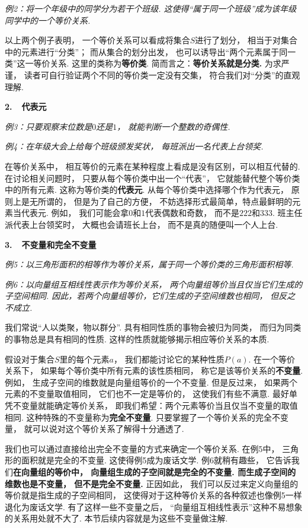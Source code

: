 \textit{例2：将一个年级中的同学分为若干个班级.
这使得“属于同一个班级”成为该年级同学中的一个等价关系.}
\medskip

以上两个例子表明，
一个等价关系可以看成将集合$S$进行了划分，
相当于对集合中的元素进行“分类”；
而从集合的划分出发，
也可以诱导出“两个元素属于同一类”这一等价关系.
这里的类称为\textbf{等价类}.
简而言之：\textbf{等价关系就是分类.}
为求严谨，
读者可自行验证两个不同的等价类一定没有交集，
符合我们对“分类”的直观理解.

\medskip

\textbf{2.~~代表元}

\textit{例3：只要观察末位数是$0$还是$1$，
就能判断一个整数的奇偶性.}

\textit{例4：在年级大会上给每个班级颁发奖状，
每班派出一名代表上台领奖.}
\medskip

在等价关系中，
相互等价的元素在某种程度上看成是没有区别，可以相互代替的.
在讨论相关问题时，
只要从每个等价类中出一个“代表”，
它就能替代整个等价类中的所有元素.
这称为等价类的\textbf{代表元}.
从每个等价类中选择哪个作为代表元，
原则上是无所谓的，
但是为了自己的方便，
不妨选择形式最简单，特点最鲜明的元素当代表元.
例如，
我们可能会拿$0$和$1$代表偶数和奇数，
而不是$222$和$333$.
班主任派代表上台领奖时，
大概也会请班长上台，
而不是真的随便叫一个人上台.
\medskip


\textbf{3.~~不变量和完全不变量}

\textit{例5：以三角形面积的相等作为等价关系，属于同一个等价类的三角形面积相等.}

\textit{例6：以向量组互相线性表示作为等价关系，
两个向量组等价当且仅当它们生成的子空间相同.
因此，若两个向量组等价，它们生成的子空间维数也相同，
但反之不成立.}
\medskip


我们常说“人以类聚，物以群分”.
具有相同性质的事物会被归为同类，
而归为同类的事物总是具有相同的性质.
这样的性质就能够揭示相应等价关系的本质.

假设对于集合$S$里的每个元素$a$，
我们都能讨论它的某种性质$P(a)$.
在一个等价关系下，
如果每个等价类中所有元素的该性质相同，
称它是该等价关系的\textbf{不变量}.
例如，
生成子空间的维数就是向量组等价的一个不变量.
但是反过来，
如果两个元素的不变量取值相同，
它们也不一定是等价的，
这使我们有些不满意.
最好单凭不变量就能确定等价关系，
即我们希望：两个元素等价当且仅当不变量的取值相同.
这种特殊的不变量称为\textbf{完全不变量}.
只要掌握了一个等价关系的完全不变量，
就可以说对这个等价关系了解得十分通透了.


我们也可以通过直接给出完全不变量的方式来确定一个等价关系.
在例5中，
三角形的面积就是完全的不变量.
这使得例5成为废话文学.
例6就稍有趣些，
它告诉我们\textbf{在向量组的等价中，
向量组生成的子空间就是完全的不变量.
而生成子空间的维数也是不变量，
但不是完全不变量.}
正因如此，
我们可以反过来定义向量组的等价就是指生成的子空间相同，
这使得对于这种等价关系的各种叙述也像例5一样退化为废话文学.
有了这样一些不变量之后，
“向量组互相线性表示”这种不易想象的关系用处就不大了.
本节后续内容就是为这些不变量做注解.

